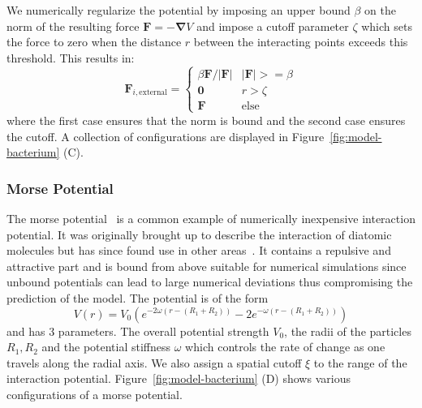 \documentclass[10pt,letterpaper]{article}
\renewcommand{\vec}[1]{\mathbf{#1}}
\begin{document}
We numerically regularize the potential by imposing an upper bound $\beta$ on the norm of the
resulting force $\vec{F} = -\vec{\nabla} V$ and impose a cutoff parameter $\zeta$ which sets the
force to zero when the distance $r$ between the interacting points exceeds this threshold.
This results in:
\begin{equation}
    \vec{F}_{i,\text{external}} = \left\{
    \begin{array}{ll}
        \beta\vec{F}/|\vec{F}| & |\vec{F}| >= \beta\\
        \vec{0} & r > \zeta\\
        \vec{F} & \text{else}
    \end{array}\right.
\end{equation}
where the first case ensures that the norm is bound and the second case ensures the cutoff.
A collection of configurations are displayed in Figure~\ref{fig:model-bacterium} (C).

\subsubsection{Morse Potential}
\label{subsec:morse-potential}

The morse potential~\cite{Morse1929} is a common example of numerically inexpensive interaction
potential.
It was originally brought up to describe the interaction of diatomic molecules but has since found
use in other areas~\cite{Breitwieser2021}.
It contains a repulsive and attractive part and is bound from above
suitable for numerical simulations since unbound potentials can lead to large numerical deviations
thus compromising the prediction of the model.
The potential is of the form
\begin{equation}
    V(r) = V_0\left(e^{-2\omega(r-(R_1+R_2))} - 2e^{-\omega(r-(R_1+R_2))}\right)
\end{equation}
and has 3 parameters.
The overall potential strength $V_0$, the radii of the particles $R_1,R_2$ and the potential
stiffness $\omega$ which controls the rate of change as one travels along the radial axis.
We also assign a spatial cutoff $\xi$ to the range of the interaction potential.
Figure~\ref{fig:model-bacterium} (D) shows various configurations of a morse potential.

\end{document}
